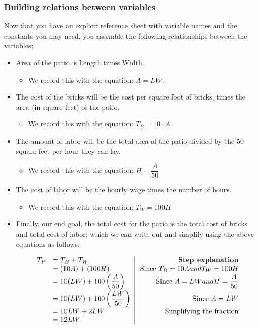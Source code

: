 {\subsubsection*{Building relations between variables}
Now that you have an explicit reference sheet with variable names and the constants you may need, you assemble the following relationships between the variables;

\begin{itemize}
\item Area of the patio is Length times Width.
    \begin{itemize}
    \item We record this with the equation: $A = LW$.
    \end{itemize}
\item The cost of the bricks will be the cost per square foot of bricks, times the area (in square feet) of the patio.
    \begin{itemize}
    \item We record this with the equation: $T_B = 10 \cdot A$
    \end{itemize}
\item The amount of labor will be the total area of the patio divided by the 50 square feet per hour they can lay.
    \begin{itemize}
    \item We record this with the equation: $H = \dfrac{A}{50}$
    \end{itemize}
\item The cost of labor will be the hourly wage times the number of hours.
    \begin{itemize}
    \item We record this with the equation: $T_W = 100H$
    \end{itemize}
\item Finally, our end goal, the total cost for the patio is the total cost of bricks and total cost of labor; which we can write out and simplify using the above equations as follows:

\[
\begin{array}{ll | r}
T_P &= T_B + T_W & \text{ \textbf{Step explanation}}\\
&= (10A) + (100H) & \text{ Since }T_B = 10A and T_W = 100H\\
&= 10(LW) + 100\left(\dfrac{A}{50}\right) & \text{ Since }A = LW and H = \dfrac{A}{50}\\
&= 10(LW) + 100\left(\dfrac{LW}{50}\right) & \text{ Since }A = LW\\
&= 10LW + 2LW & \text{ Simplifying the fraction}\\
&= 12LW
\end{array}
\]


\end{itemize}}

